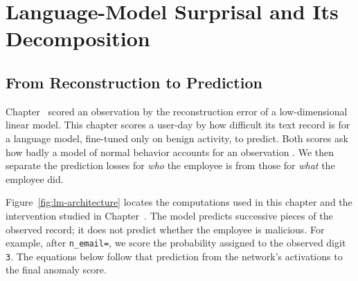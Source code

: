 \documentclass[12pt]{report}
\newcommand{\chref}[1]{Chapter~\uppercase\expandafter{\romannumeral\getrefnumber{#1}}}
\begin{document}
\FloatBarrier
\chapter{Language-Model Surprisal and Its Decomposition}
\label{ch:lm}

\section{From Reconstruction to Prediction}
\chref{ch:pca} scored an observation by the reconstruction error of a low-dimensional
linear model. This chapter scores a user-day by how difficult its text record is
for a language model, fine-tuned only on benign activity, to predict. Both scores
ask how badly a model of normal behavior accounts for an observation
\cite{du2017deeplog,tuor2017deep}. We then separate the prediction losses for
\emph{who} the employee is from those for \emph{what} the employee did.

Figure~\ref{fig:lm-architecture} locates the computations used in this chapter and
the intervention studied in \chref{ch:mech}. The model predicts successive pieces
of the observed record; it does not predict whether the employee is malicious.
For example, after \texttt{n\_email=}, we score the probability assigned to the
observed digit \texttt{3}. The equations below follow that prediction from the
network's activations to the final anomaly score.
\end{document}
